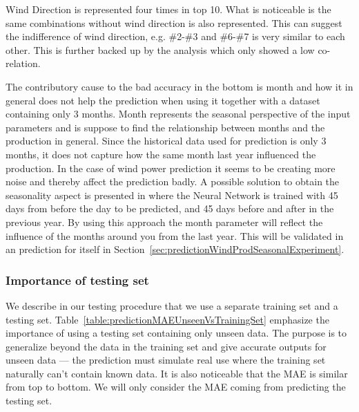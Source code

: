 Wind Direction is represented four times in top 10. What is noticeable is the same combinations without wind direction is also represented. This can suggest the indifference of wind direction, e.g. \#2-\#3 and \#6-\#7 is very similar to each other. This is further backed up by the analysis which only showed a low co-relation.

The contributory cause to the bad accuracy in the bottom is month and how it in general does not help the prediction when using it together with a dataset containing only 3 months. Month represents the seasonal perspective of the input parameters and is suppose to find the relationship between months and the production in general. Since the historical data used for prediction is only 3 months, it does not capture how the same month last year influenced the production. In the case of wind power prediction it seems to be creating more noise and thereby affect the prediction badly. A possible solution to obtain the seasonality aspect is presented in\cite{pjmForecast} where the Neural Network is trained with 45 days from before the day to be predicted, and 45 days before and after in the previous year. By using this approach the month parameter will reflect the influence of the months around you from the last year. This will be validated in an prediction for itself in Section~\ref{sec:predictionWindProdSeasonalExperiment}.

\subsubsection{Importance of testing set}
We describe in our testing procedure that we use a separate training set and a testing set. Table~\ref{table:predictionMAEUnseenVsTrainingSet} emphasize the importance of using a testing set containing only unseen data. The purpose is to generalize beyond the data in the training set and give accurate outputs for unseen data \cite{1} --- the prediction must simulate real use where the training set naturally can't contain known data. It is also noticeable that the MAE is similar from top to bottom. We will only consider the MAE coming from predicting the testing set.

